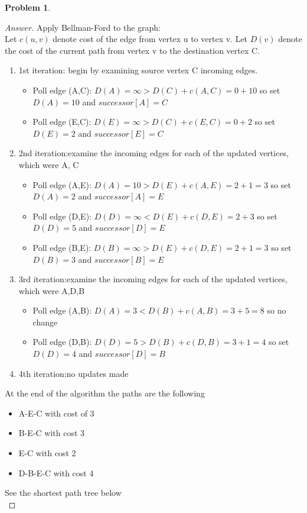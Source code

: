 \documentclass[11pt]{article}
\theoremstyle{definition}
\theoremstyle{definition}
\newtheorem{required}{Problem}
\theoremstyle{definition}
\begin{document}
\begin{required}
\begin{proof}[Answer]
Apply Bellman-Ford to the graph: \\
Let $c(u,v)$ denote cost of the edge from vertex u to vertex v. Let $D(v)$ denote the cost of the current path from vertex v to the destination vertex C. 
\begin{enumerate}
\item 1st iteration: begin by examining source vertex C incoming edges. 
	\begin{itemize}
	\item Poll edge (A,C): $D(A)=\infty > D(C)+c(A,C)=0+10$ so set $D(A)=10$ and $successor[A]=C$
	\item Poll edge (E,C): $D(E)=\infty > D(C)+c(E,C)=0+2$ so set $D(E)=2$ and $successor[E]=C$
	\end{itemize}
\item 2nd iteration:examine the incoming edges for each of the updated vertices, which were A, C 
	\begin{itemize}
	\item Poll edge (A,E): $D(A)=10 > D(E)+c(A,E)=2+1=3$ so set $D(A)=2$ and $successor[A]=E$
	\item Poll edge (D,E): $D(D)=\infty < D(E)+c(D,E)=2+3$ so set $D(D)=5$ and $successor[D]=E$
	\item Poll edge (B,E): $D(B)=\infty> D(E)+c(D,E)=2+1=3$ so set $D(B)=3$ and $successor[B]=E$
	\end{itemize}
\item 3rd iteration:examine the incoming edges for each of the updated vertices, which were A,D,B 
	\begin{itemize}
	\item Poll edge (A,B): $D(A)=3< D(B)+c(A,B)=3+5=8$ so no change
	\item Poll edge (D,B): $D(D)=5 > D(B)+c(D,B)=3+1=4$ so set $D(D)=4$ and $successor[D]=B$
	\end{itemize}
\item 4th iteration:no updates made
\end{enumerate}
At the end of the algorithm the paths are the following\\
\begin{itemize}
\item A-E-C with cost of 3
\item B-E-C with cost 3
\item E-C with cost 2
\item D-B-E-C with cost 4
\end{itemize}
See the shortest path tree below \\

\end{proof}
\end{required}
\end{document}
